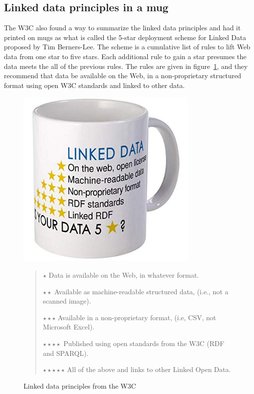 \hypertarget{linked-data-principles-in-a-mug}{%
\subsection{Linked data principles in a
mug}\label{linked-data-principles-in-a-mug}}

The W3C also found a way to summarize the linked data principles and had
it printed on mugs as what is called the 5-star deployment scheme for
Linked Data proposed by Tim Berners-Lee. The scheme is a cumulative list
of rules to lift Web data from one star to five stars. Each additional
rule to gain a star presumes the data meets the all of the previous
rules. The rules are given in figure~\ref{fig:ch5.13}, and they recommend that
data be available on the Web, in a non-proprietary structured format
using open W3C standards and linked to other data.

\begin{figure}
\includegraphics[width=3.5in]{media/ch5/figure-05-13.jpg}
\begin{quote}
$\star{}$ Data is available on the Web, in whatever format.

$\star{}\star{}$ Available as machine-readable structured data, (i.e., not a scanned
image).

$\star\star\star$ Available in a non-proprietary format, (i.e, CSV, not Microsoft
Excel).

$\star\star\star\star$ Published using open standards from the W3C (RDF and SPARQL).

$\star\star\star\star\star$ All of the above and links to other Linked Open Data.
\end{quote}
\caption{Linked data principles from the W3C}
\label{fig:ch5.13}
\end{figure}


